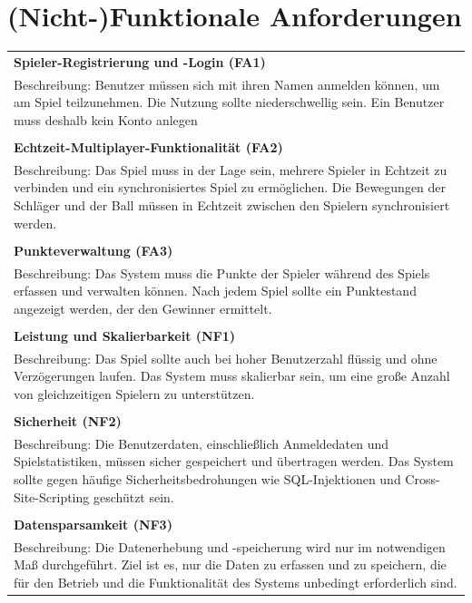 \documentclass[
]{article}
\begin{document}
\section{(Nicht-)Funktionale Anforderungen}
\begin{center}
  \begin{tabular}{|p{\linewidth + 20pt}|}
    \hline
    \textbf{Spieler-Registrierung und -Login (FA1)} \\
    Beschreibung: Benutzer müssen sich mit ihren Namen anmelden können, um am Spiel teilzunehmen.
    Die Nutzung sollte niederschwellig sein. Ein Benutzer muss deshalb kein Konto anlegen \\ \\
    \hline
    \textbf{Echtzeit-Multiplayer-Funktionalität (FA2)} \\
    Beschreibung: Das Spiel muss in der Lage sein, mehrere Spieler in Echtzeit zu verbinden und ein synchronisiertes Spiel zu ermöglichen. Die Bewegungen der Schläger und der Ball müssen in Echtzeit zwischen den Spielern synchronisiert werden.\\ \\
    \hline
    \textbf{Punkteverwaltung (FA3)} \\
    Beschreibung: Das System muss die Punkte der Spieler während des Spiels erfassen und verwalten können. Nach jedem Spiel sollte ein Punktestand angezeigt werden, der den Gewinner ermittelt. \\ \\
    \hline
     \textbf{Leistung und Skalierbarkeit (NF1)} \\
    Beschreibung: Das Spiel sollte auch bei hoher Benutzerzahl flüssig und ohne Verzögerungen laufen. Das System muss skalierbar sein, um eine große Anzahl von gleichzeitigen Spielern zu unterstützen. \\ \\
    \hline
    \textbf{Sicherheit (NF2)} \\
    Beschreibung: Die Benutzerdaten, einschließlich Anmeldedaten und Spielstatistiken, müssen sicher gespeichert und übertragen werden. Das System sollte gegen häufige Sicherheitsbedrohungen wie SQL-Injektionen und Cross-Site-Scripting geschützt sein.\\ \\
    \hline
    \textbf{Datensparsamkeit (NF3)} \\
     Beschreibung:
     Die Datenerhebung und -speicherung wird nur im notwendigen Maß durchgeführt. 
     Ziel ist es, nur die Daten zu erfassen und zu speichern, die für den Betrieb und die Funktionalität des Systems unbedingt erforderlich sind. 

\end{tabular}
\end{center}
\end{document}
